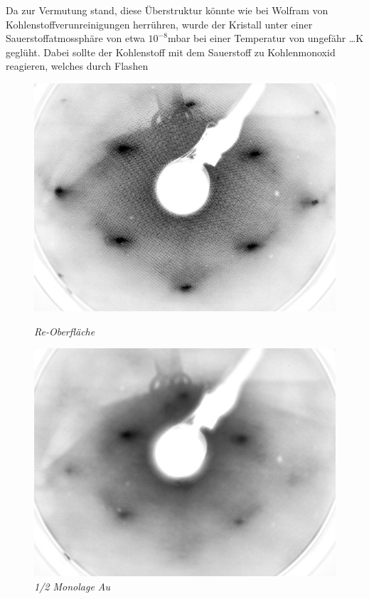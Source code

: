 Da zur Vermutung stand, diese Überstruktur könnte wie bei Wolfram von Kohlenstoffverunreinigungen
herrühren, wurde der Kristall unter einer Sauerstoffatmossphäre von etwa $10^{-8}$mbar bei einer
Temperatur von ungefähr \ldots K geglüht. Dabei sollte der Kohlenstoff mit dem Sauerstoff zu
Kohlenmonoxid reagieren, welches durch Flashen

\begin{figure}[htbp]
		\captionsetup{name=Abb.}
	\begin{minipage}[b]{0.5\textwidth} 
		\includegraphics[width=\textwidth]{LEED-Bilder/bearbeitet/unbedampft_E207}
		\caption{\textit{Re-Oberfläche}}
		\label{0ML} 
	\end{minipage}
	\hfill
	\begin{minipage}[b]{0.5\textwidth}
		\includegraphics[width=\textwidth]{LEED-Bilder/bearbeitet/0_5ML_E208}
		\caption{\textit{1/2 Monolage Au}}
		\label{1/2ML} 
	\end{minipage}
	

\end{figure}
